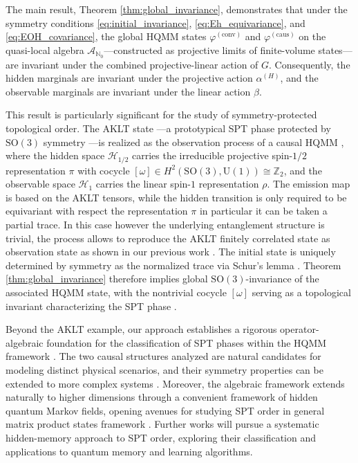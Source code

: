 \documentclass[12pt,a4paper]{article}
\begin{document}
The main result, Theorem \ref{thm:global_invariance}, demonstrates that under the symmetry conditions \eqref{eq:initial_invariance}, \eqref{eq:Eh_equivariance}, and \eqref{eq:EOH_covariance}, the global HQMM states $\varphi^{(\text{conv})}$ and $\varphi^{(\text{caus})}$ on the quasi-local algebra $\mathcal{A}_{\mathbb{N}_0}$—constructed as projective limits of finite-volume states—are invariant under the combined projective-linear action of $G$. Consequently, the hidden marginals are invariant under the projective action $\alpha^{(H)}$, and the observable marginals are invariant under the linear action $\beta$.

This result is particularly significant for the study of symmetry-protected topological order. The AKLT state \cite{AKLT1987, Affleck1988}—a prototypical SPT phase protected by $\mathrm{SO}(3)$ symmetry \cite{H83, D20}—is realized as the observation process of a causal HQMM \cite{SouBarhqmm2026}, where the hidden space $\mathcal{H}_{1/2}$ carries the irreducible projective spin-$1/2$ representation $\pi$ with cocycle $[\omega] \in H^2(\mathrm{SO}(3), \mathrm{U}(1)) \cong \mathbb{Z}_2$, and the observable space $\mathcal{H}_1$ carries the linear spin-$1$ representation $\rho$. The emission map is based on  the AKLT tensors, while the  hidden transition  is only required to be equivariant with respect the representation $\pi$ in particular it can be taken a partial trace. In this case however the underlying  entanglement structure is trivial, the process allows to reproduce the AKLT finitely correlated state as observation state as shown in our previous work \cite{SouBarhqmm2026}. The initial state is uniquely determined by symmetry as the normalized trace via Schur's lemma \cite{OP87}. Theorem \ref{thm:global_invariance} therefore implies global $\mathrm{SO}(3)$-invariance of the associated HQMM state, with the nontrivial cocycle $[\omega]$ serving as a topological invariant characterizing the SPT phase \cite{Pollmann2010, Pollmann2012, Tas23}.

Beyond the AKLT example, our approach establishes a rigorous operator-algebraic foundation for the classification of SPT phases within the HQMM framework \cite{Soza19, Vo25}. The two causal structures analyzed are natural candidates for modeling distinct physical scenarios, and their symmetry properties  can be extended to more complex  systems \cite{OP87}. Moreover, the algebraic framework extends naturally to higher dimensions through  a convenient framework of hidden quantum Markov fields, opening avenues for studying SPT order in  general matrix product states framework \cite{D20}. Further works will pursue a systematic hidden-memory approach to SPT order, exploring their classification and applications to quantum memory and learning algorithms.
\end{document}
